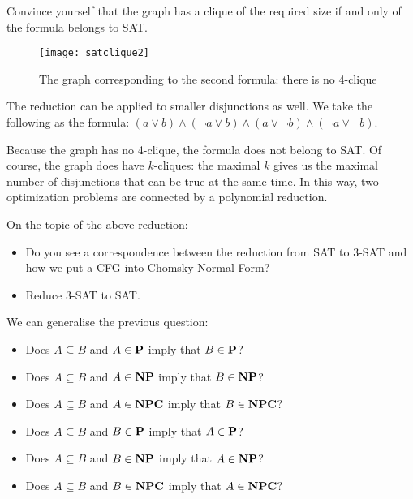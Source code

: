 Convince yourself that the graph has a clique of the required size if
and only of the formula belongs to SAT.

\begin{figure}[h]
	\centering
	\texttt{[image: satclique2]}
	\caption{The graph corresponding to the second formula: there is no 4-clique}\label{satclique2}
\end{figure}

\begin{example}
The reduction can be applied to smaller disjunctions as well. We take the following
as the formula: $(a \vee b) \wedge (\neg a \vee b) \wedge (a \vee \neg b)
\wedge (\neg a \vee \neg b)$.

Because the graph has no 4-clique, the formula does not belong to
SAT. Of course, the graph does have $k$-cliques: the maximal $k$ gives us
the maximal number of disjunctions that can be true at the same
time. In this way, two optimization problems are connected by a
polynomial reduction.

\end{example}

\begin{exercise}
On the topic of the above reduction:
\begin{itemize}
\item Do you see a correspondence between the reduction from SAT to 3-SAT
and how we put a CFG into Chomsky Normal Form?

\item Reduce $3$-SAT to SAT.
\end{itemize}
\end{exercise}

\begin{exercise}
We can generalise the previous question:

\begin{itemize}
\item Does $A \subseteq B$ and $A \in \P$ imply that $B \in \P$?

\item Does $A \subseteq B$ and $A \in \NP$ imply that $B \in \NP$?

\item Does $A \subseteq B$ and $A \in \NPC$ imply that $B \in \NPC$?

\item Does $A \subseteq B$ and $B \in \P$ imply that $A \in \P$?

\item Does $A \subseteq B$ and $B \in \NP$ imply that $A \in \NP$?

\item Does $A \subseteq B$ and $B \in \NPC$ imply that $A \in \NPC$?

\end{itemize}

\end{exercise}

